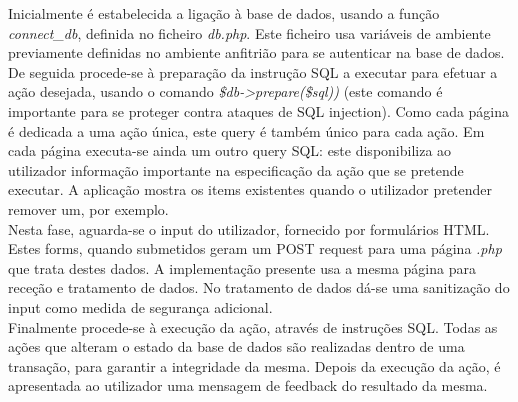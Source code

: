 \documentclass[12pt]{report}
\begin{document}
    \hspace*{1em}Inicialmente é estabelecida a ligação à base de dados, usando a função \textit{connect\_db}, definida no ficheiro \textit{db.php}. Este ficheiro usa variáveis de ambiente previamente definidas no ambiente anfitrião para se autenticar na base de dados.
    \\
    
    \hspace*{1em} De seguida procede-se à preparação da instrução SQL a executar para efetuar a ação desejada, usando o comando \textit{\$db->prepare(\$sql))} (este comando é importante para se proteger contra ataques de SQL injection). Como cada página é dedicada a uma ação única, este query é também único para cada ação.
    Em cada página executa-se ainda um outro query SQL: este disponibiliza ao utilizador informação importante na especificação da ação que se pretende executar. A aplicação mostra os items existentes quando o utilizador pretender remover um, por exemplo.
    \\
    
    \hspace*{1em} Nesta fase, aguarda-se o input do utilizador, fornecido por formulários HTML. Estes forms, quando submetidos geram um POST request para uma página \textit{.php} que trata destes dados. A implementação presente usa a mesma página para receção e tratamento de dados. No tratamento de dados dá-se uma sanitização do input como medida de segurança adicional.
    \\
    
    \hspace*{1em} Finalmente procede-se à execução da ação, através de instruções SQL. Todas as ações que alteram o estado da base de dados são realizadas dentro de uma transação, para garantir a integridade da mesma. Depois da execução da ação, é apresentada ao utilizador uma mensagem de feedback do resultado da mesma.
    \\
    
    
    
\end{document}
